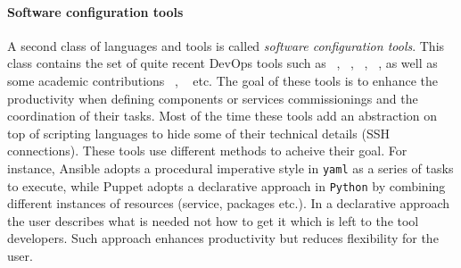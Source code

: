 \paragraph{Software configuration tools}
A second class of languages and tools is called \emph{software
  configuration tools}. This class contains the set of quite recent
DevOps tools such as \ansible~\cite{}, \puppet~\cite{}, \chef~\cite{},
\salt~\cite{}, as well as some academic contributions
\deployware~\cite{}, \aeolus~\cite{} etc. The goal of these tools is
to enhance the productivity when defining components or services
commissionings and the coordination of their tasks. Most of the time
these tools add an abstraction on top of scripting languages to hide
some of their technical details (\eg SSH connections). These tools use
different methods to acheive their goal. For instance, Ansible adopts
a procedural imperative style in \texttt{yaml} as a series of tasks to
execute, while Puppet adopts a declarative approach in \texttt{Python}
by combining different instances of resources (\ie service, packages
etc.). In a declarative approach the user describes what is needed not
how to get it which is left to the tool developers. Such approach
enhances productivity but reduces flexibility for the user.

